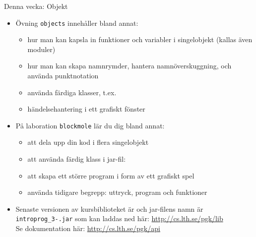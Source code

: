 
\ifkompendium\else
\begin{SlideExtra}{Denna vecka: Objekt}
\begin{itemize}
\item Övning \texttt{objects} innehåller bland annat:
\begin{itemize}
\item hur man kan kapsla in funktioner och variabler i singelobjekt (kallas även moduler)
\item hur man kan skapa namnrymder, hantera namnöverskuggning, och använda punktnotation
\item använda färdiga klasser, t.ex. 
\item händelsehantering i ett grafiskt fönster
\end{itemize}

\item På laboration \texttt{blockmole} lär du dig bland annat:
\begin{itemize}
  \item att dela upp din kod i flera singelobjekt
  \item att använda färdig klass i jar-fil: 
  \item att skapa ett större program i form av ett grafiskt spel
  \item använda tidigare begrepp: uttryck, program och funktioner
\end{itemize}

\item Senaste versionen av kursbiblioteket  är \Emph{\LibVersion} och jar-filens namn är \texttt{introprog\_3-\LibVersion.jar} som kan laddas ned här: \url{http://cs.lth.se/pgk/lib}\\Se dokumentation här: \url{http://cs.lth.se/pgk/api}
\end{itemize}
\end{SlideExtra}
\fi



